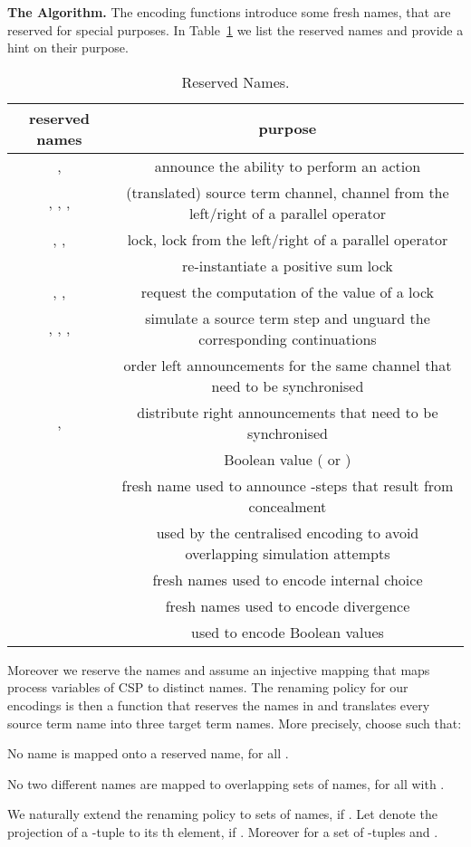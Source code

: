\documentclass[copyright,creativecommons]{eptcs}
\begin{document}
\vspace{0.3em}
\noindent
\textbf{The Algorithm.}\;
The encoding functions introduce some fresh names, that are reserved for special purposes. In Table~\ref{tab:resNam} we list the reserved names  and provide a hint on their purpose.
\begin{table}[t]
	\begin{tabular}{|c|c|}
		\hline
		reserved names & purpose\\
		\hline
		,  & announce the ability to perform an action\\
		, , ,  & (translated) source term channel, channel from the left/right of a parallel operator\\
		, ,  & lock, lock from the left/right of a parallel operator\\
		 & re-instantiate a positive sum lock\\
		, ,  & request the computation of the value of a lock\\
		, , ,  & simulate a source term step and unguard the corresponding continuations\\
		 & order left announcements for the same channel that need to be synchronised\\
		,  & distribute right announcements that need to be synchronised\\
		 & Boolean value ( or )\\
		 & fresh name used to announce -steps that result from concealment\\
		 & used by the centralised encoding to avoid overlapping simulation attempts\\
		 & fresh names used to encode internal choice\\
		 & fresh names used to encode divergence\\
		 & used to encode Boolean values\\
		\hline
	\end{tabular}
	\caption{Reserved Names.}
	\label{tab:resNam}
\end{table}
Moreover we reserve the names  and assume an injective mapping  that maps process variables of CSP to distinct names.
The renaming policy  for our encodings is then a function that reserves the names in  and translates every source term name into three target term names. More precisely, choose  such that:
\begin{compactenum}
	\item No name is mapped onto a reserved name, \ie  for all .
	\item No two different names are mapped to overlapping sets of names, \ie  for all  with .
\end{compactenum}
We naturally extend the renaming policy to sets of names, \ie  if .
Let  denote the projection of a -tuple to its th element, if . Moreover  for a set  of -tuples and .
\end{document}
